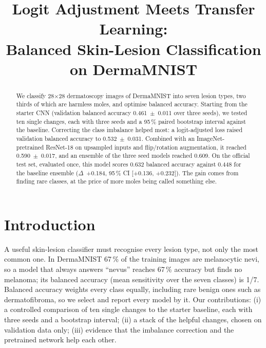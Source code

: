 \documentclass[conference]{IEEEtran}
\begin{document}
\title{Logit Adjustment Meets Transfer Learning:\\ Balanced Skin-Lesion Classification on DermaMNIST}

\author{
\and
{}
\and
{}
\and
{}}

\maketitle

\begin{abstract}
We classify 28$\times$28 dermatoscopy images of DermaMNIST into seven lesion types, two thirds of which are
harmless moles, and optimise balanced accuracy. Starting from the starter CNN (validation balanced accuracy
0.461~$\pm$~0.011 over three seeds), we tested ten single changes, each with three seeds and a 95\,\% paired
bootstrap interval against the baseline. Correcting the class imbalance helped most: a logit-adjusted loss
raised validation balanced accuracy to 0.532~$\pm$~0.031. Combined with an ImageNet-pretrained ResNet-18 on
upsampled inputs and flip/rotation augmentation, it reached 0.590~$\pm$~0.017, and an ensemble of the three
seed models reached 0.609. On the official test set, evaluated once, this model scores 0.632 balanced
accuracy against 0.448 for the baseline ensemble ($\Delta$~+0.184, 95\,\% CI [+0.136, +0.232]). The gain
comes from finding rare classes, at the price of more moles being called something else.
\end{abstract}

\section{Introduction}
A useful skin-lesion classifier must recognise every lesion type, not only the most common one. In DermaMNIST 67\,\% of the training images are melanocytic nevi, so a model that always
answers ``nevus'' reaches 67\,\% accuracy but finds no melanoma; its balanced accuracy (mean sensitivity over
the seven classes) is 1/7. Balanced accuracy weights every class equally, including rare benign ones such as
dermatofibroma, so we select and report every model by it.
Our contributions: (i) a controlled comparison of ten single changes to the starter baseline, each with three
seeds and a bootstrap interval; (ii) a stack of the helpful changes, chosen on validation data only;
(iii) evidence that the imbalance correction and the pretrained network help each other.
\end{document}
